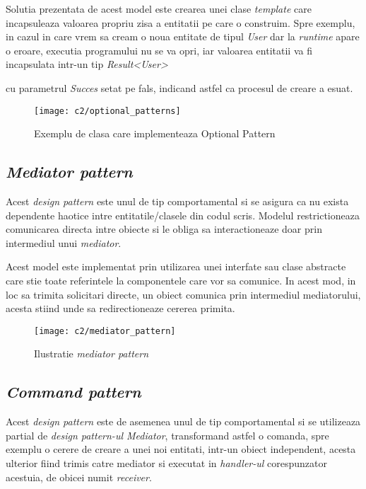 Solutia prezentata de acest model este crearea unei clase \textit{template} care incapsuleaza valoarea propriu zisa a entitatii pe care o construim. Spre exemplu, in cazul in care vrem sa cream o noua entitate de tipul \textit{User} dar la \textit{runtime} apare o eroare, executia programului nu se va opri, iar valoarea entitatii va fi incapsulata intr-un tip   \textit{Result\textless User\textgreater}

 cu parametrul \textit{Succes} setat pe fals, indicand astfel ca procesul de creare a esuat.\\

\begin{figure}[h]
	\centering
	
	\texttt{[image: c2/optional\_patterns]}
	\caption{Exemplu de clasa care implementeaza Optional Pattern}
\end{figure}

\subsection*{\textit{Mediator pattern}}
Acest \textit{design pattern} este unul de tip comportamental si se asigura ca nu exista dependente haotice intre entitatile/clasele din codul scris. Modelul restrictioneaza comunicarea directa intre obiecte si le obliga sa interactioneaze doar prin intermediul unui \textit{mediator}.

Acest model este implementat prin utilizarea unei interfate sau clase abstracte care stie toate referintele la componentele care vor sa comunice. In acest mod, in loc sa trimita solicitari directe, un obiect comunica prin intermediul mediatorului, acesta stiind unde sa redirectioneaze cererea primita.


\begin{figure}[h]
	\centering
	
	\texttt{[image: c2/mediator\_pattern]}
	\caption{Ilustratie \textit{mediator pattern}}
\end{figure}

	\newpage
\subsection*{\textit{Command pattern}}	

Acest \textit{design pattern} este de asemenea unul de tip comportamental si se utilizeaza partial de \textit{design pattern-ul Mediator}, transformand astfel o comanda, spre exemplu o cerere de creare a unei noi entitati, intr-un obiect independent, acesta ulterior fiind trimis catre mediator si executat in \textit{handler-ul} corespunzator acestuia, de obicei numit \textit{receiver}.

